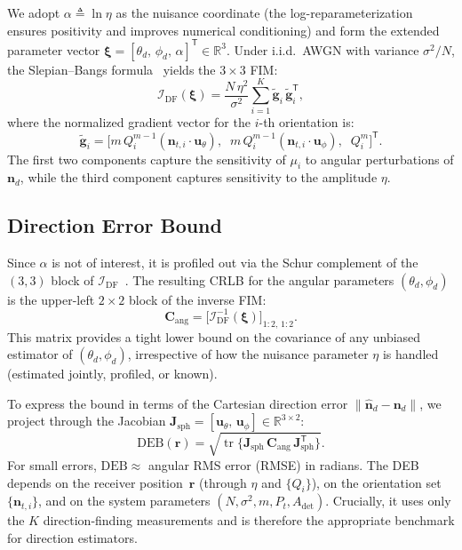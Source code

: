 \documentclass[journal]{IEEEtran}
\begin{document}
We adopt $\alpha\triangleq\ln\eta$ as the nuisance coordinate (the log-reparameterization ensures positivity and improves numerical conditioning) and form the extended parameter vector $\boldsymbol{\xi}=[\theta_d,\,\phi_d,\,\alpha]^{\mathsf T}\in\mathbb{R}^3$.  Under i.i.d.\ AWGN with variance $\sigma^2/N$, the Slepian--Bangs formula~\cite{Kay1993} yields the $3\times3$ FIM:
\begin{equation}
\mathcal{I}_{\mathrm{DF}}(\boldsymbol\xi)
= \frac{N\,\eta^2}{\sigma^2}
  \sum_{i=1}^{K}
  \tilde{\mathbf g}_i\,\tilde{\mathbf g}_i^{\mathsf T},
\label{eq:FIM_DEB}
\end{equation}
where the normalized gradient vector for the $i$-th orientation is:
\begin{equation}
\tilde{\mathbf g}_i = \bigl[m\,Q_i^{m-1}(\mathbf{n}_{t,i}\!\cdot\!\mathbf{u}_\theta),\;\;m\,Q_i^{m-1}(\mathbf{n}_{t,i}\!\cdot\!\mathbf{u}_\phi),\;\;Q_i^m\bigr]^{\mathsf T}.
\label{eq:grad_xi}
\end{equation}
The first two components capture the sensitivity of $\mu_i$ to angular perturbations of $\mathbf{n}_d$, while the third component captures sensitivity to the amplitude $\eta$.

\subsection{Direction Error Bound}
\label{subsec:DEB}
Since $\alpha$ is not of interest, it is profiled out via the Schur complement of the $(3,3)$ block of $\mathcal{I}_{\mathrm{DF}}$~\cite{Kay1993}.  The resulting CRLB for the angular parameters $(\theta_d,\phi_d)$ is the upper-left $2\times2$ block of the inverse FIM:
\begin{equation}
\mathbf{C}_{\mathrm{ang}} = \bigl[\mathcal{I}_{\mathrm{DF}}^{-1}(\boldsymbol\xi)\bigr]_{1:2,\,1:2}.
\label{eq:C_ang}
\end{equation}
This matrix provides a tight lower bound on the covariance of any unbiased estimator of $(\theta_d,\phi_d)$, irrespective of how the nuisance parameter $\eta$ is handled (estimated jointly, profiled, or known).

To express the bound in terms of the Cartesian direction error $\lVert\hat{\mathbf{n}}_d - \mathbf{n}_d\rVert$, we project through the Jacobian $\mathbf{J}_{\mathrm{sph}}=[\mathbf{u}_\theta,\,\mathbf{u}_\phi]\in\mathbb{R}^{3\times2}$:
\begin{equation}
\mathrm{DEB}(\mathbf{r})
= \sqrt{\operatorname{tr}\!\bigl\{\mathbf{J}_{\mathrm{sph}}\,\mathbf{C}_{\mathrm{ang}}\,\mathbf{J}_{\mathrm{sph}}^{\mathsf T}\bigr\}}.
\label{eq:DEB}
\end{equation}
For small errors, $\mathrm{DEB}\approx$ angular RMS error (RMSE) in radians. The DEB depends on the receiver position~$\mathbf{r}$ (through $\eta$ and $\{Q_i\}$), on the orientation set $\{\mathbf{n}_{t,i}\}$, and on the system parameters $(N,\sigma^2,m,P_t,A_{\mathrm{det}})$.  Crucially, it uses only the $K$ direction-finding measurements and is therefore the appropriate benchmark for direction estimators.
\end{document}
